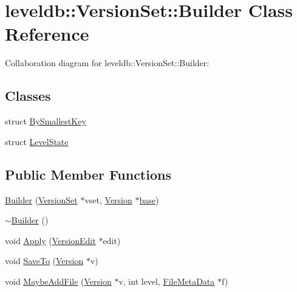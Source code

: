 \hypertarget{classleveldb_1_1_version_set_1_1_builder}{\section{leveldb\-:\-:Version\-Set\-:\-:Builder Class Reference}
\label{classleveldb_1_1_version_set_1_1_builder}
}


Collaboration diagram for leveldb\-:\-:Version\-Set\-:\-:Builder\-:
\subsection*{Classes}
\begin{DoxyCompactItemize}
\item 
struct \hyperlink{structleveldb_1_1_version_set_1_1_builder_1_1_by_smallest_key}{By\-Smallest\-Key}
\item 
struct \hyperlink{structleveldb_1_1_version_set_1_1_builder_1_1_level_state}{Level\-State}
\end{DoxyCompactItemize}
\subsection*{Public Member Functions}
\begin{DoxyCompactItemize}
\item 
\hyperlink{classleveldb_1_1_version_set_1_1_builder_a19d0dd9aec1b825e7d938e9ac24dc4f7}{Builder} (\hyperlink{classleveldb_1_1_version_set}{Version\-Set} $\ast$vset, \hyperlink{classleveldb_1_1_version}{Version} $\ast$\hyperlink{testharness_8cc_a70ff0f6c026c3dd1ef6aaf504e7fddc3}{base})
\item 
\hyperlink{classleveldb_1_1_version_set_1_1_builder_acd7047ca78d8c654967101f53d10792c}{$\sim$\-Builder} ()
\item 
void \hyperlink{classleveldb_1_1_version_set_1_1_builder_aef505b4363ebc56b8fa5deb55087993f}{Apply} (\hyperlink{classleveldb_1_1_version_edit}{Version\-Edit} $\ast$edit)
\item 
void \hyperlink{classleveldb_1_1_version_set_1_1_builder_a429b23cc022cac08ab2ba880ac5803d1}{Save\-To} (\hyperlink{classleveldb_1_1_version}{Version} $\ast$v)
\item 
void \hyperlink{classleveldb_1_1_version_set_1_1_builder_aa90e0d9d0f8e05b8bcfa879d4f4a88c6}{Maybe\-Add\-File} (\hyperlink{classleveldb_1_1_version}{Version} $\ast$v, int level, \hyperlink{structleveldb_1_1_file_meta_data}{File\-Meta\-Data} $\ast$f)
\end{DoxyCompactItemize}

